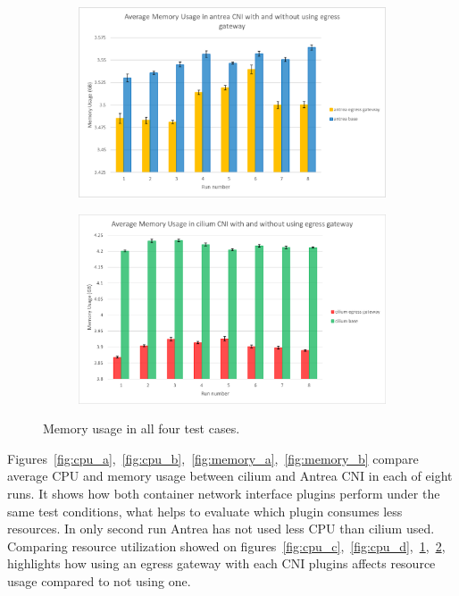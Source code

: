 \begin{figure}[H]
    \begin{subfigure}[b]{0.35\textwidth}
        \includegraphics[width=\textwidth]{plots/small/memory_antrea.png}
        \caption{}
        \label{fig:memory_c}
    \end{subfigure}
    \hfill
    \begin{subfigure}[b]{0.35\textwidth}
        \includegraphics[width=\textwidth]{plots/small/memory_cilium.png}
        \caption{}
        \label{fig:memory_d}
    \end{subfigure}
    
    \caption{Memory usage in all four test cases.}
    \label{fig:memoryFour}
\end{figure}

Figures~\ref{fig:cpu_a},~\ref{fig:cpu_b},~\ref{fig:memory_a},~\ref{fig:memory_b} compare average CPU and memory usage between cilium and Antrea CNI in each of eight runs. It shows how both container network interface plugins perform under the same test conditions, what helps to evaluate which plugin consumes less resources. In only second run Antrea has not used less CPU than cilium used.
Comparing resource utilization showed on figures~\ref{fig:cpu_c},~\ref{fig:cpu_d},~\ref{fig:memory_c},~\ref{fig:memory_d}, highlights how using an egress gateway with each CNI plugins affects resource usage compared to not using one.

